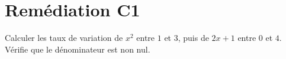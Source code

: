 \section*{Remédiation C1} Calculer les taux de variation de $x^2$ entre $1$ et $3$, puis de $2x+1$ entre $0$ et $4$.  Vérifie que le dénominateur est non nul.
